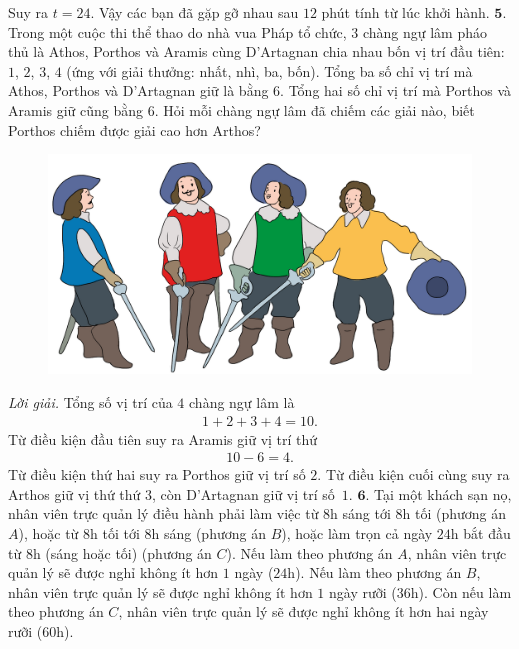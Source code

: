 \begin{multicols}{2}
\begin{figure}[H]
	\end{figure}
	Suy ra $t=24$.
	Vậy các bạn đã gặp gỡ nhau sau $12$ phút tính từ lúc khởi hành.
	\vskip 0.1cm
	$\pmb{5.}$ Trong một cuộc thi thể thao do nhà vua Pháp tổ chức, $3$ chàng ngự lâm pháo thủ là Athos, Porthos và Aramis cùng D'Artagnan chia nhau bốn vị trí đầu tiên: $1$, $2$, $3$, $4$ (ứng với giải thưởng: nhất, nhì, ba, bốn). Tổng ba số chỉ vị trí mà Athos, Porthos và D'Artagnan giữ là bằng $6$. Tổng hai số chỉ vị trí mà Porthos và Aramis giữ cũng bằng $6$. Hỏi mỗi chàng ngự lâm đã chiếm các giải nào, biết Porthos chiếm được giải cao hơn Arthos?
	\begin{figure}[H]
		\centering
		\vspace*{-5pt}
		\captionsetup{labelformat= empty, justification=centering}
		\includegraphics[width=1\linewidth]{Pi3_bai5}
		\vspace*{-15pt}
	\end{figure}
	\textit{Lời giải.} 	Tổng số vị trí của $4$ chàng ngự lâm là 
	\begin{align*}
		1+2+3+4 =10.
	\end{align*} 
	Từ điều kiện đầu tiên suy ra Aramis giữ vị trí thứ 
	\begin{align*}
		10-6 = 4.
	\end{align*}
	Từ điều kiện thứ hai suy ra Porthos giữ vị trí số $2$. Từ điều kiện cuối cùng suy ra Arthos giữ vị thứ thứ $3$, còn D'Artagnan giữ vị trí số~$1$.
	\vskip 0.1cm
	$\pmb{6.}$ Tại một khách sạn nọ, nhân viên trực quản lý điều hành phải làm việc từ $8$h sáng tới $8$h tối (phương án $A$), hoặc từ $8$h tối tới $8$h sáng (phương án $B$), hoặc làm trọn cả ngày $24$h bắt đầu từ $8$h (sáng hoặc tối) (phương án $C$). Nếu làm theo phương án $A$, nhân viên trực quản lý sẽ được nghỉ không ít hơn $1$ ngày ($24$h). Nếu làm theo phương án $B$, nhân viên trực quản lý sẽ được nghỉ không ít hơn $1$ ngày rưỡi ($36$h). Còn nếu làm theo phương án $C$, nhân viên trực quản lý sẽ được nghỉ không ít hơn hai ngày rưỡi ($60$h).

\end{multicols}
